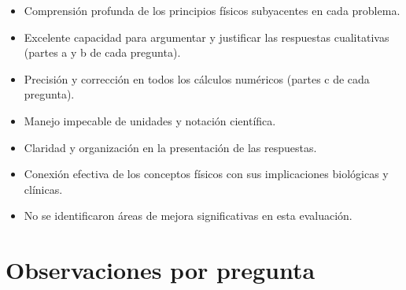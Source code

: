 \documentclass[11pt,a4paper]{article}
\begin{document}
\vspace{4pt}
\begin{minipage}[t]{0.48\linewidth}
  \begin{tcolorbox}[cajaFortaleza, title={Fortalezas}]
\begin{itemize}[leftmargin=1.5em, itemsep=2pt]
  \item Comprensión profunda de los principios físicos subyacentes en cada problema.
  \item Excelente capacidad para argumentar y justificar las respuestas cualitativas (partes a y b de cada pregunta).
  \item Precisión y corrección en todos los cálculos numéricos (partes c de cada pregunta).
  \item Manejo impecable de unidades y notación científica.
  \item Claridad y organización en la presentación de las respuestas.
  \item Conexión efectiva de los conceptos físicos con sus implicaciones biológicas y clínicas.
\end{itemize}
  \end{tcolorbox}
\end{minipage}
\hfill
\begin{minipage}[t]{0.48\linewidth}
  \begin{tcolorbox}[cajaMejora, title={Areas de mejora}]
\begin{itemize}[leftmargin=1.5em, itemsep=2pt]
  \item No se identificaron áreas de mejora significativas en esta evaluación.
\end{itemize}
  \end{tcolorbox}
\end{minipage}

\section*{Observaciones por pregunta}
\end{document}
